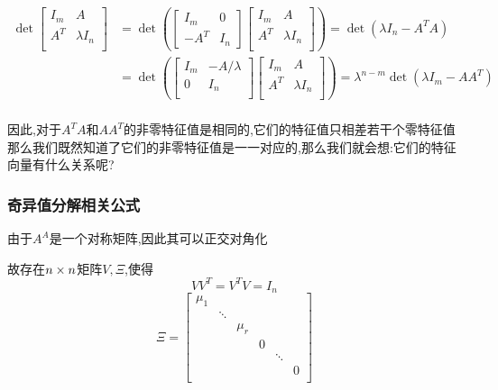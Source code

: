 \documentclass{article}
\newcommand{\RR}{\mathbb{R}}
\newcommand{\parameter}[1]{\left(#1\right)}
\newcommand{\ve}{\boldsymbol}
\begin{document}
\begin{CJK}{UTF8}{gkai}
\[
\begin{aligned}    
\det\begin{bmatrix}
    I_m & A\\
    A^T & \lambda I_n\\
\end{bmatrix} &= \det\parameter{\begin{bmatrix}
    I_m & 0\\
    -A^T & I_n
\end{bmatrix}\begin{bmatrix}
    I_m & A\\
    A^T & \lambda I_n\\
\end{bmatrix}} = \det(\lambda I_n - A^T A)\\
&= \det\parameter{\begin{bmatrix}
    I_m & -A/\lambda\\
    0 & I_n\\
\end{bmatrix}
\begin{bmatrix}
    I_m & A\\
    A^T & \lambda I_n\\
\end{bmatrix}} = \lambda^{n - m} \det(\lambda I_m - AA^T)\\
\end{aligned}
\]

因此,对于$A^TA$和$AA^T$的非零特征值是相同的,它们的特征值只相差若干个零特征值\\

那么我们既然知道了它们的非零特征值是一一对应的,那么我们就会想:它们的特征向量有什么关系呢?


\subsubsection{奇异值分解相关公式}
由于$A^A$是一个对称矩阵,因此其可以正交对角化

故存在$n\times n$矩阵$V,\varXi$,使得
\begin{equation}
    VV^T = V^T V = I_n
\end{equation}
\begin{equation}
    \varXi = \begin{bmatrix}
        \mu_1 &&&&&\\
        &\ddots&&&&\\
        &&\mu_r&&&\\
        &&&0&&\\
        &&&&\ddots&\\
        &&&&&0\\
    \end{bmatrix}
\end{equation}


\end{CJK}
\end{document}
